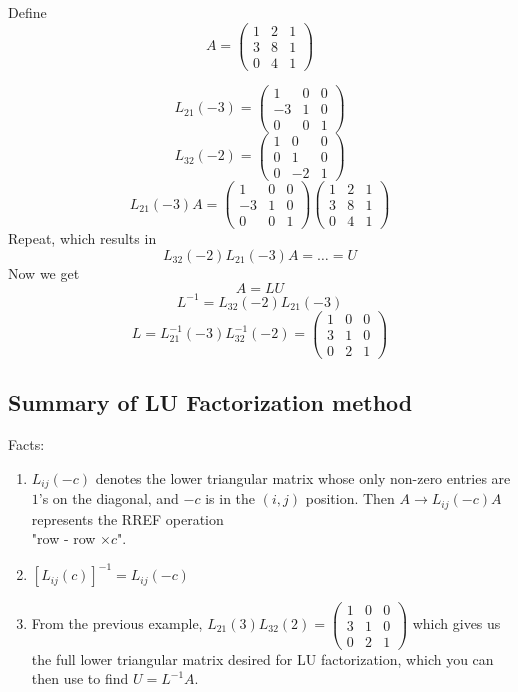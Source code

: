 \documentclass[11pt]{article}
\begin{document}
\begin{example}
Define
\[
    A = \begin{pmatrix}
        1 & 2 & 1 \\
        3 & 8 & 1\\
        0 & 4 & 1
    \end{pmatrix}
\]

\[
    L_{21}(-3) = \begin{pmatrix}
        1 & 0 & 0 \\
        -3 & 1 & 0 \\
        0 & 0 & 1
    \end{pmatrix}
\]
\[
    L_{32}(-2) = \begin{pmatrix}
        1 & 0 & 0 \\
        0 & 1 & 0 \\
        0 & -2 & 1 
    \end{pmatrix}
\]
\[
    L_{21}(-3) A = \begin{pmatrix}
        1 & 0 & 0 \\
        -3 & 1 & 0 \\
        0 & 0 & 1
    \end{pmatrix} \begin{pmatrix}
        1 & 2 & 1 \\
        3 & 8 & 1\\
        0 & 4 & 1
    \end{pmatrix}
\]
Repeat, which results in
\[
  L_{32}(-2) L_{21}(-3) A = \dots = U
\]
Now we get
\[
    A = LU
\]
\[
    L^{-1} = L_{32}(-2)L_{21}(-3)
\]
\[
    L = L_{21}^{-1}(-3) L_{32}^{-1}(-2) = \begin{pmatrix}
        1& 0 & 0 \\
        3 & 1 & 0\\
        0 & 2 & 1
    \end{pmatrix}
\]
\end{example}
\subsection{Summary of LU Factorization method}
Facts: 
\begin{enumerate}
    \item $L_{ij}(-c)$ denotes the lower triangular matrix whose only non-zero entries are $1$'s on
    the diagonal, and $-c$ is in the $(i,j)$ position. Then $A \rightarrow L_{ij}(-c)A$ represents the RREF operation \\"row - row $\times c$".
    \item $[L_{ij}(c)]^{-1} = L_{ij}(-c)$
    \item From the previous example, $L_{21}(3)L_{32}(2) = \begin{pmatrix}
        1 & 0 & 0\\
        3 & 1 & 0\\
        0 & 2 & 1
    \end{pmatrix}$
    which gives us the full lower triangular matrix desired for LU factorization, which you can then use to find $U = L^{-1} A$.
\end{enumerate}
\end{document}
